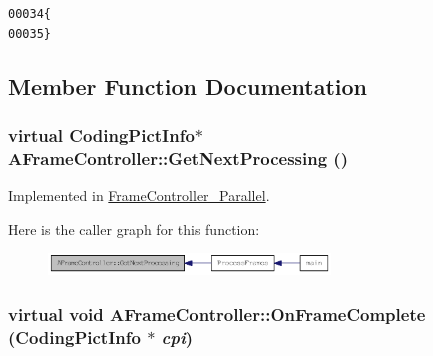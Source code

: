 \begin{footnotesize}\begin{alltt}
00034         \{
00035         \}
\end{alltt}\end{footnotesize}




\subsection{Member Function Documentation}
\hypertarget{class_a_frame_controller_acc142fa10ce535ee171698af719c4d27}{
\subsubsection[{GetNextProcessing}]{\setlength{\rightskip}{0pt plus 5cm}virtual {\bf CodingPictInfo}$\ast$ AFrameController::GetNextProcessing ()}}
\label{class_a_frame_controller_acc142fa10ce535ee171698af719c4d27}


Implemented in \hyperlink{class_frame_controller___parallel_a51792b5fe70db6d99be59c110dbc3041}{FrameController\_\-Parallel}.



Here is the caller graph for this function:\nopagebreak
\begin{figure}[H]
\begin{center}
\leavevmode
\includegraphics[width=212pt]{class_a_frame_controller_acc142fa10ce535ee171698af719c4d27_icgraph}
\end{center}
\end{figure}


\hypertarget{class_a_frame_controller_afd4834463eebfc33536fed009bfb966c}{
\subsubsection[{OnFrameComplete}]{\setlength{\rightskip}{0pt plus 5cm}virtual void AFrameController::OnFrameComplete ({\bf CodingPictInfo} $\ast$ {\em cpi})}}
\label{class_a_frame_controller_afd4834463eebfc33536fed009bfb966c}



